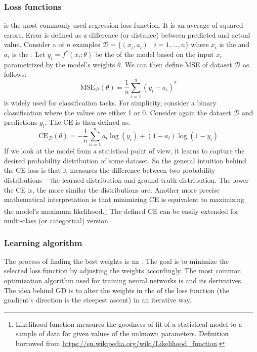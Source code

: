 \subsubsection{Loss functions}

 is the most commonly used regression loss
function. It is an average of squared errors. Error is defined as a difference
(or distance) between predicted and actual value. Consider a  of $n$
examples $\mathcal{D} = \{(x_i, a_i)\mid i = 1,...,n\}$ where $x_i$ is the 
and $a_i$ is the . Let $y_i = f^*(x_i; \theta)$ be the  of the model based on the input $x_i$ parametrized by the model's weights
$\theta$. We can then define MSE of dataset $\mathcal{D}$ as follows:
$$
    \text{MSE}_{\mathcal{D}}(\theta) =
    \frac{1}{n}\sum\limits^{n}_{i=1}(y_i - a_i)^2
$$
 is widely used for classification tasks. For
simplicity, consider a binary classification where the values are either 1 or 0.
Consider again the dataset $\mathcal{D}$ and predictions $y_i$. The CE is then
defined as:
$$
    \text{CE}_\mathcal{D}(\theta) =
    -\frac{1}{n}\sum\limits_{n=1}^{n} a_i \log(y_i) + (1-a_i)\log(1-y_i)
$$
If we look at the model from a statistical point of view, it learns to capture
the desired probability distribution of some dataset. So the general intuition
behind the CE loss is that it measures the difference between two probability
distributions -- the learned distribution and ground-truth distribution. The
lower the CE is, the more similar the distributions are. Another more precise
mathematical interpretation is that minimizing CE is equivalent to maximizing
the model's maximum likelihood.\footnote{Likelihood function measures the
    goodness of fit of a statistical model to a sample of data for given values
    of the unknown parameters. Definition borrowed from
    \url{https://en.wikipedia.org/wiki/Likelihood_function}.
} The defined CE can be easily extended for multi-class (or categorical)
version.

\subsubsection{Learning algorithm}
The process of finding the best weights is an . The
goal is to minimize the selected loss function by adjusting the weights
accordingly. The most common optimization algorithm used for training neural
networks is  and its derivatives. The idea behind GD
is to alter the weights in the  of the
loss function (the gradient's direction is the steepest ascent) in an iterative
way.

